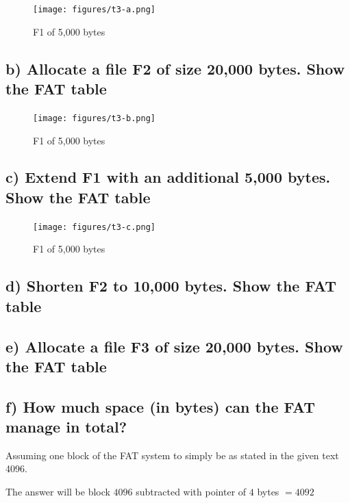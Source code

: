 \documentclass[11pt,a4paper]{article}
\theoremstyle{plain}
\theoremstyle{definition}
\theoremstyle{remark}
\numberwithin{equation}{section}
\begin{document}
\begin{figure}[H]
    \caption{F1 of 5,000 bytes}
    \centering
    \texttt{[image: figures/t3-a.png]}
\end{figure}



\subsection*{b) Allocate a file F2 of size 20,000 bytes. Show the FAT table}

\begin{figure}[H]
    \caption{F1 of 5,000 bytes}
    \centering
    \texttt{[image: figures/t3-b.png]}
\end{figure}




\subsection*{c) Extend F1 with an additional 5,000 bytes. Show the FAT table}

\begin{figure}[H]
    \caption{F1 of 5,000 bytes}
    \centering
    \texttt{[image: figures/t3-c.png]}
\end{figure}



\subsection*{d) Shorten F2 to 10,000 bytes. Show the FAT table}





\subsection*{e) Allocate a file F3 of size 20,000 bytes. Show the FAT table}




\subsection*{f) How much space (in bytes) can the FAT manage in total?}
Assuming one block of the FAT system to simply be as stated in the given text 4096.

The answer will be block $4096$ subtracted with pointer of $4$ bytes $= 4092$
\end{document}
